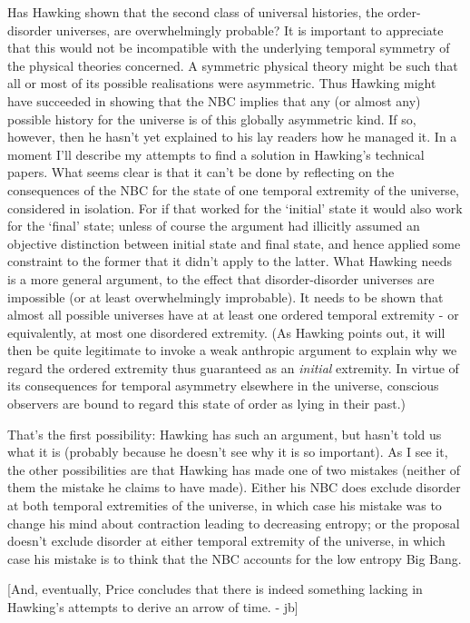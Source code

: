 \documentclass{article}
\begin{document}
Has Hawking shown that the second class of universal histories, the
order-disorder universes, are overwhelmingly probable? It is important
to appreciate that this would not be incompatible with the underlying
temporal symmetry of the physical theories concerned. A symmetric
physical theory might be such that all or most of its possible
realisations were asymmetric. Thus Hawking might have succeeded in
showing that the NBC implies that any (or almost any) possible history
for the universe is of this globally asymmetric kind. If so, however,
then he hasn't yet explained to his lay readers how he managed it. In a
moment I'll describe my attempts to find a solution in Hawking's
technical papers. What seems clear is that it can't be done by
reflecting on the consequences of the NBC for the state of one temporal
extremity of the universe, considered in isolation. For if that worked
for the `initial' state it would also work for the `final' state; unless
of course the argument had illicitly assumed an objective distinction
between initial state and final state, and hence applied some constraint
to the former that it didn't apply to the latter. What Hawking needs is
a more general argument, to the effect that disorder-disorder universes
are impossible (or at least overwhelmingly improbable). It needs to be
shown that almost all possible universes have at at least one ordered
temporal extremity - or equivalently, at most one disordered extremity.
(As Hawking points out, it will then be quite legitimate to invoke a
weak anthropic argument to explain why we regard the ordered extremity
thus guaranteed as an \emph{initial} extremity. In virtue of its
consequences for temporal asymmetry elsewhere in the universe, conscious
observers are bound to regard this state of order as lying in their
past.)

That's the first possibility: Hawking has such an argument, but hasn't
told us what it is (probably because he doesn't see why it is so
important). As I see it, the other possibilities are that Hawking has
made one of two mistakes (neither of them the mistake he claims to have
made). Either his NBC does exclude disorder at both temporal extremities
of the universe, in which case his mistake was to change his mind about
contraction leading to decreasing entropy; or the proposal doesn't
exclude disorder at either temporal extremity of the universe, in which
case his mistake is to think that the NBC accounts for the low entropy
Big Bang.

{[}And, eventually, Price concludes that there is indeed something
lacking in Hawking's attempts to derive an arrow of time. - jb{]}
\end{document}
